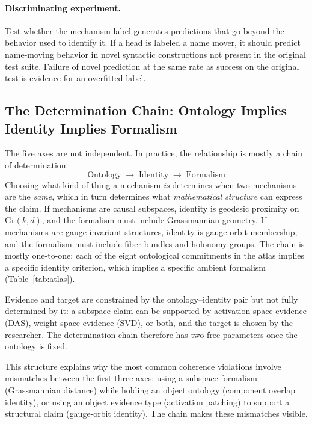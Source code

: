 \documentclass[11pt]{article}
\theoremstyle{remark}
\newcommand{\Gr}{\mathrm{Gr}}
\begin{document}
\paragraph{Discriminating experiment.}
Test whether the mechanism label generates predictions that go beyond
the behavior used to identify it.  If a head is labeled a name mover,
it should predict name-moving behavior in novel syntactic constructions
not present in the original test suite.  Failure of novel prediction
at the same rate as success on the original test is evidence for an
overfitted label.

\subsection{The Determination Chain: Ontology Implies Identity Implies Formalism}\label{sec:chain}

The five axes are not independent.  In practice, the relationship is
mostly a chain of determination:
\[
\text{Ontology} \;\longrightarrow\; \text{Identity} \;\longrightarrow\; \text{Formalism}
\]
Choosing what kind of thing a mechanism \emph{is} determines when two
mechanisms are the \emph{same}, which in turn determines what
\emph{mathematical structure} can express the claim.  If mechanisms are
causal subspaces, identity is geodesic proximity on $\Gr(k,d)$, and the
formalism must include Grassmannian geometry.  If mechanisms are
gauge-invariant structures, identity is gauge-orbit membership, and the
formalism must include fiber bundles and holonomy groups.  The chain is
mostly one-to-one: each of the eight ontological commitments in the atlas
implies a specific identity criterion, which implies a specific ambient
formalism (Table~\ref{tab:atlas}).

Evidence and target are constrained by the ontology--identity pair but
not fully determined by it: a subspace claim can be supported by
activation-space evidence (DAS), weight-space evidence (SVD), or both,
and the target is chosen by the researcher.  The determination chain
therefore has two free parameters once the ontology is fixed.

This structure explains why the most common coherence violations involve
mismatches between the first three axes: using a subspace formalism
(Grassmannian distance) while holding an object ontology (component
overlap identity), or using an object evidence type (activation patching)
to support a structural claim (gauge-orbit identity).  The chain makes
these mismatches visible.
\end{document}
